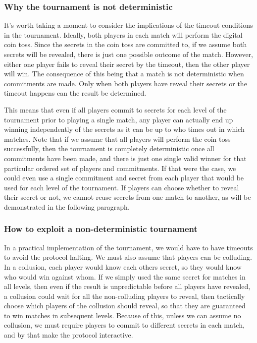 \subsubsection{Why the tournament is not deterministic}  %
It's worth taking a moment to consider the implications of the timeout conditions in the tournament. Ideally, both players in each match will perform the digital coin toss. Since the secrets in the coin toss are committed to, if we assume both secrets will be revealed, there is just one possible outcome of the match. However, either one player fails to reveal their secret by the timeout, then the other player will win. The consequence of this being that a match is not deterministic when commitments are made. Only when both players have reveal their secrets or the timeout happens can the result be determined. 

This means that even if all players commit to secrets for each level of the tournament prior to playing a single match, any player can actually end up winning independently of the secrets as it can be up to who times out in which matches. Note that if we assume that all players will perform the coin toss successfully, then the tournament is completely deterministic once all commitments have been made, and there is just one single valid winner for that particular ordered set of players and commitments. If that were the case, we could even use a single commitment and secret from each player that would be used for each level of the tournament. If players can choose whether to reveal their secret or not, we cannot reuse secrets from one match to another, as will be demonstrated in the following paragraph.

\subsubsection{How to exploit a non-deterministic tournament}  %
In a practical implementation of the tournament, we would have to have timeouts to avoid the protocol halting. We must also assume that players can be colluding. In a collusion, each player would know each others secret, so they would know who would win against whom. If we simply used the same secret for matches in all levels, then even if the result is unpredictable before all players have revealed, a collusion could wait for all the non-colluding players to reveal, then tactically choose which players of the collusion should reveal, so that they are guaranteed to win matches in subsequent levels. Because of this, unless we can assume no collusion, we must require players to commit to different secrets in each match, and by that make the protocol interactive.

